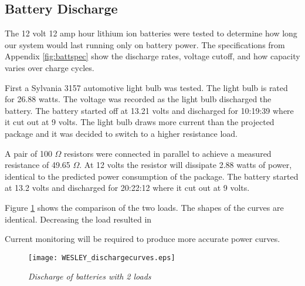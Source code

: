 \subsection{Battery Discharge}

The 12 volt 12 amp hour lithium ion batteries were tested to determine how long our system would last running only on battery power.  The specifications from Appendix \ref{fig:battspec} show the discharge rates, voltage cutoff, and how capacity varies over charge cycles.

\indent First a Sylvania 3157 automotive light bulb was tested. The light bulb is rated for 26.88 watts.  The voltage was recorded as the light bulb discharged the battery. The battery started off at 13.21 volts and discharged for 10:19:39 where it cut out at 9 volts. The light bulb draws more current than the projected package and it was decided to switch to a higher resistance load.
 
\indent A pair of 100 $\Omega$ resistors were connected in parallel to achieve a measured resistance of 49.65  $\Omega$. At 12 volts the resistor will dissipate 2.88 watts of power, identical to the predicted power consumption of the package.  The battery started at 13.2 volts and discharged for 20:22:12 where it cut out at 9 volts. 

\indent Figure \ref{fig:discharge} shows the comparison of the two loads. The shapes of the curves are identical. Decreasing the load resulted in 

\indent Current monitoring will be required to produce more accurate power curves. 

\begin{figure}
\centering
\texttt{[image: WESLEY\_dischargecurves.eps]}
 \caption{\textit{Discharge of batteries with 2 loads}}
\label{fig:discharge}
\end{figure}
